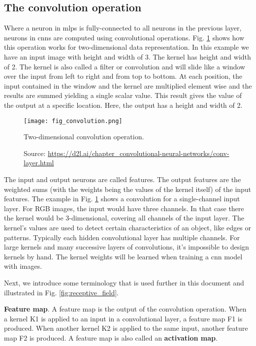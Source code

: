 \subsection{The convolution operation}
Where a neuron in \acrshort{mlp}s is fully-connected to all neurons in the previous layer, neurons in \acrshort{cnn}s are computed using convolutional operations. Fig. \ref{fig:convolution} shows how this operation works for two-dimensional data representation. In this example we have an input image with height and width of 3. The kernel has height and width of 2. The kernel is also called a filter or convolution and will slide like a window over the input from left to right and from top to bottom. At each position, the input contained in the window and the kernel are multiplied element wise and the results are summed yielding a single scalar value. This result gives the value of the output at a specific location. Here, the output has a height and width of 2.
\begin{figure}[ht]
    \begin{center}       
    \texttt{[image: fig\_convolution.png]}
    \caption[Two-dimensional convolution operation]{Two-dimensional convolution operation.}
    \caption*{Source: \href{https://d2l.ai/chapter\_convolutional-neural-networks/conv-layer.html}{https://d2l.ai/chapter\_convolutional-neural-networks/conv-layer.html}}
    \label{fig:convolution}
    \end{center}
\end{figure}

The input and output neurons are called features. The output features are the weighted sums (with the weights being the values of the kernel itself) of the input features. The example in Fig. \ref{fig:convolution} shows a convolution for a single-channel input layer. For RGB images, the input would have three channels. In that case there the kernel would be 3-dimensional, covering all channels of the input layer. The kernel's values are used to detect certain characteristics of an object, like edges or patterns. Typically each hidden convolutional layer has multiple channels. For large kernels and many successive layers of convolutions, it's impossible to design kernels by hand. The kernel weights will be learned when training a \acrshort{cnn} model with images.

Next, we introduce some terminology that is used further in this document and illustrated in Fig. \ref{fig:receptive_field}.

\textbf{Feature map}. A feature map is the output of the convolution operation. When a kernel K1 is applied to an input in a convolutional layer, a feature map F1 is produced. When another kernel K2 is applied to the same input, another feature map F2 is produced. A feature map is also called an \textbf{activation map}.

